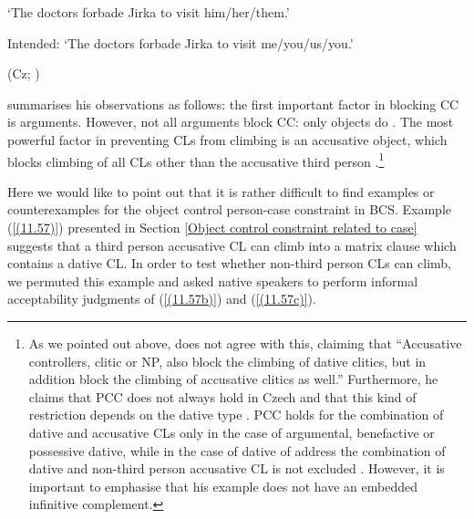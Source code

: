 \begin{exe}\ex
\begin{xlist}
\glt ‘The doctors forbade Jirka to visit him/her/them.’
\end{xlist}
\glt Intended: ‘The doctors forbade Jirka to visit me/you/us/you.’ \\ 
\strut\hfill (Cz; \citealt[80f]{Dotlacil04})
\end{exe}

\noindent \citet[81]{Dotlacil04} summarises his observations as follows: the first important factor in blocking CC is arguments. However, not all arguments block CC: only objects do \citep[81]{Dotlacil04}. The most powerful factor in preventing CLs from climbing is an accusative object, which blocks climbing of all CLs other than the accusative third person \citep[81]{Dotlacil04}.\footnote{As we pointed out above, \citet[18]{Rezac05} does not agree with this, claiming that “Accusative controllers, clitic or NP, also block the climbing of dative clitics, but in addition block the climbing of accusative clitics as well.” Furthermore, he claims that PCC does not always hold in Czech and that this kind of restriction depends on the dative type \citep[cf.][25]{Rezac05}. PCC holds for the combination of dative and accusative CLs only in the case of argumental, benefactive or possessive dative, while in the case of dative of address the combination of dative and non-third person accusative CL is not excluded \citep[cf.][25]{Rezac05}. However, it is important to emphasise that his example does not have an embedded infinitive complement.}

Here we would like to point out that it is rather difficult to find examples or counterexamples for the object control person-case constraint in BCS. Example (\ref{(11.57)}) presented in Section \ref{Object control constraint related to case} suggests that a third person accusative CL can climb into a matrix clause which contains a dative CL. In order to test whether non-third person CLs can climb, we permuted this example and asked native speakers to perform informal acceptability judgments of (\ref{(11.57b)}) and (\ref{(11.57c)}).

